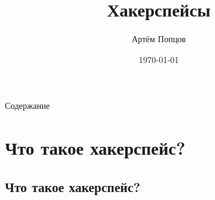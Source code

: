 \documentclass[presentation]{beamer}
\author{Артём Попцов}
\date{\today}
\title{Хакерспейсы}
\begin{document}
\maketitle

\begin{frame}{Содержание}

\setcounter{tocdepth}{1}
\tableofcontents
\end{frame}

\section{Что такое хакерспейс?}

\label{sec-1}
\subsection{Что такое хакерспейс?}

\label{sec-1-1}
\end{document}
